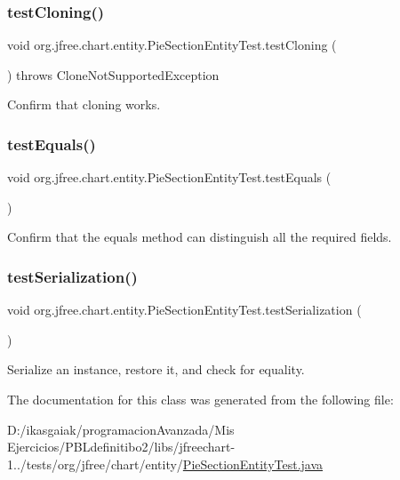 \subsubsection{\texorpdfstring{test\+Cloning()}{testCloning()}}
{\footnotesize\ttfamily void org.\+jfree.\+chart.\+entity.\+Pie\+Section\+Entity\+Test.\+test\+Cloning (\begin{DoxyParamCaption}{ }\end{DoxyParamCaption}) throws Clone\+Not\+Supported\+Exception}

Confirm that cloning works. \mbox{\label{classorg_1_1jfree_1_1chart_1_1entity_1_1_pie_section_entity_test_a4f0ad4ac1967c1262589ed0868298bdf}} 
\subsubsection{\texorpdfstring{test\+Equals()}{testEquals()}}
{\footnotesize\ttfamily void org.\+jfree.\+chart.\+entity.\+Pie\+Section\+Entity\+Test.\+test\+Equals (\begin{DoxyParamCaption}{ }\end{DoxyParamCaption})}

Confirm that the equals method can distinguish all the required fields. \mbox{\label{classorg_1_1jfree_1_1chart_1_1entity_1_1_pie_section_entity_test_a2dd0931dd921cac7b5444226c1dfdd20}} 
\subsubsection{\texorpdfstring{test\+Serialization()}{testSerialization()}}
{\footnotesize\ttfamily void org.\+jfree.\+chart.\+entity.\+Pie\+Section\+Entity\+Test.\+test\+Serialization (\begin{DoxyParamCaption}{ }\end{DoxyParamCaption})}

Serialize an instance, restore it, and check for equality. 

The documentation for this class was generated from the following file\+:\begin{DoxyCompactItemize}
\item 
D\+:/ikasgaiak/programacion\+Avanzada/\+Mis Ejercicios/\+P\+B\+Ldefinitibo2/libs/jfreechart-\/1../tests/org/jfree/chart/entity/\mbox{\hyperlink{_pie_section_entity_test_8java}{Pie\+Section\+Entity\+Test.\+java}}\end{DoxyCompactItemize}
